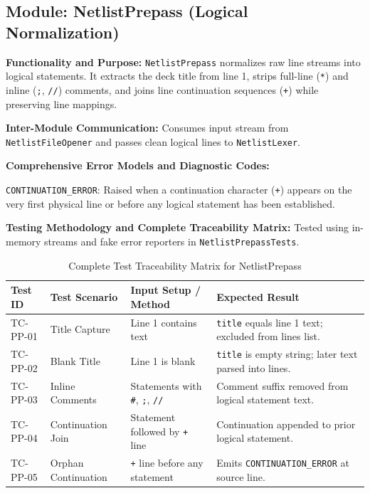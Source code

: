 \subsection{Module: NetlistPrepass (Logical Normalization)}

\textbf{Functionality and Purpose:} \texttt{NetlistPrepass} normalizes raw line streams into logical statements. It extracts the deck title from line 1, strips full-line (\texttt{*}) and inline (\texttt{;}, \texttt{//}) comments, and joins line continuation sequences (\texttt{+}) while preserving line mappings.

\textbf{Inter-Module Communication:} Consumes input stream from \texttt{NetlistFileOpener} and passes clean logical lines to \texttt{NetlistLexer}.

\textbf{Comprehensive Error Models and Diagnostic Codes:}
\begin{compactitem}
    \item \texttt{CONTINUATION\_ERROR}: Raised when a continuation character (\texttt{+}) appears on the very first physical line or before any logical statement has been established.
\end{compactitem}

\textbf{Testing Methodology and Complete Traceability Matrix:} Tested using in-memory streams and fake error reporters in \texttt{NetlistPrepassTests}.

\begin{table}[H]
\centering
\small
\begin{tabular}{|l|l|p{4.5cm}|p{4.5cm}|}
\hline
\textbf{Test ID} & \textbf{Test Scenario} & \textbf{Input Setup / Method} & \textbf{Expected Result} \\
\hline
TC-PP-01 & Title Capture & Line 1 contains text & \texttt{title} equals line 1 text; excluded from lines list. \\
\hline
TC-PP-02 & Blank Title & Line 1 is blank & \texttt{title} is empty string; later text parsed into lines. \\
\hline
TC-PP-03 & Inline Comments & Statements with \texttt{\#}, \texttt{;}, \texttt{//} & Comment suffix removed from logical statement text. \\
\hline
TC-PP-04 & Continuation Join & Statement followed by \texttt{+} line & Continuation appended to prior logical statement. \\
\hline
TC-PP-05 & Orphan Continuation & \texttt{+} line before any statement & Emits \texttt{CONTINUATION\_ERROR} at source line. \\
\hline
\end{tabular}
\caption{Complete Test Traceability Matrix for NetlistPrepass}
\end{table}


